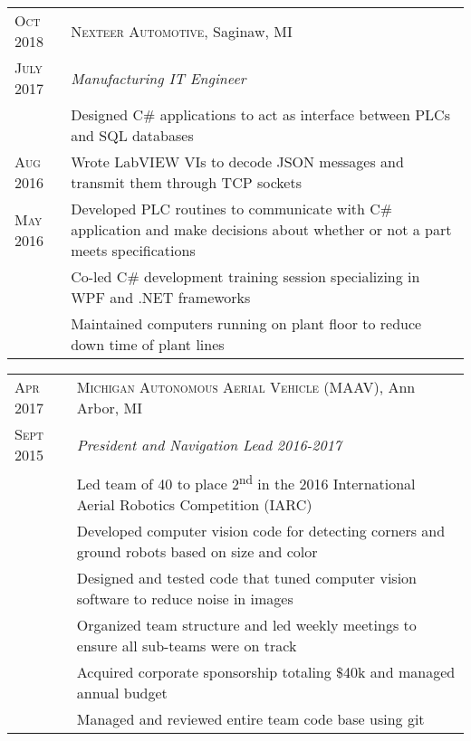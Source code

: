 \documentclass[a4paper,12pt]{article} %
\begin{document}

\begin{tabular}{R{2.1cm}|p{15.5cm}}
\textsc{Oct 2018} & \textsc{Nexteer Automotive}, Saginaw, MI \\
\textsc{July 2017} & \emph{Manufacturing IT Engineer} \\
& \footnotesize{Designed C\# applications to act as interface
  between PLCs and SQL databases} \\
\textsc{Aug 2016} & \footnotesize{Wrote LabVIEW VIs to decode JSON messages
  and transmit them through TCP sockets}\\
\textsc{May 2016} & \footnotesize{Developed PLC routines to communicate with C\#
  application and make decisions about whether or not a part meets specifications} \\
& \footnotesize{Co-led C\# development training session specializing in WPF and
 .NET frameworks}\\
& \footnotesize{Maintained computers running on plant floor to reduce down time
  of plant lines} \\
\end{tabular}


\begin{tabular}{R{2.1cm}|p{15.5cm}}
\textsc{Apr 2017} & \textsc{Michigan Autonomous Aerial Vehicle (MAAV)}, Ann Arbor, MI\\
\textsc{Sept 2015} & \emph{President and Navigation Lead 2016-2017} \\
& \footnotesize{Led team of 40 to place 2\textsuperscript{nd} in the 2016
  International Aerial Robotics Competition (IARC)} \\
& \footnotesize{Developed computer vision code for detecting corners and
  ground robots based on size and color} \\
& \footnotesize{Designed and tested code that tuned computer vision software to
  reduce noise in images} \\
& \footnotesize{Organized team structure and led weekly meetings to ensure all
  sub-teams were on track} \\
& \footnotesize{Acquired corporate sponsorship totaling \$40k and managed annual
  budget} \\
& \footnotesize{Managed and reviewed entire team code base using git} \\
\end{tabular}
\end{document}

